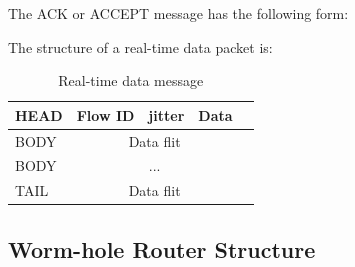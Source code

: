 \documentclass[conference, twocolumn]{IEEEtran}
\theoremstyle{definition}
\begin{document}
The ACK or ACCEPT message has the following form:


\begin{table}[htbp]
\begin{center}
\end{center}
\caption{SETUP path message}
\label{table:PathMsg}
\end{table}


The structure of a real-time data packet is:

\begin{table}[htbp]
\begin{center}{
  \begin{tabular}{ | l | l | l | l | l |}
    \hline
	HEAD & Flow ID & jitter & Data \\ \hline 
	BODY & \multicolumn{3}{|c|}{Data flit} \\ \hline
	BODY &\multicolumn{3}{|c|}{...} \\ \hline
	TAIL & \multicolumn{3}{|c|}{Data flit} \\
    \hline
  \end{tabular}
}
\end{center}
\caption{Real-time data message}
\label{table:DataMsg}
\end{table}


% 

\subsection{Worm-hole Router Structure}
\end{document}
